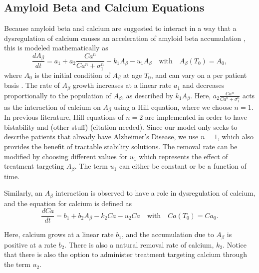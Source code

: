 \documentclass[12pt]{article}
\theoremstyle{definition}
\begin{document}
\subsection{Amyloid Beta and Calcium Equations}
Because amyloid beta and calcium are suggested to interact in a way that a dysregulation of calcium causes an acceleration of amyloid beta accumulation \cite{pal2025nonequilibrium}, this is modeled mathematically as 
\begin{equation}
    \label{eq:abeta_dt}
    \frac{dA_{\beta}}{dt} = a_{1} + a_{2} \frac{Ca^n}{Ca^n + \sigma_1^n} - k_{1} A_{\beta} - u_{1} A_{\beta} \quad \text{with} \quad A_{\beta}(T_{0}) = A_{0},
\end{equation}
where $A_0$ is the initial condition of $A_\beta$ at age $T_0$, and can vary on a per patient basis \cite{hao2022optimal}. The rate of $A_\beta$ growth increases at a linear rate $a_1$ and decreases proportionally to the population of $A_\beta$, as described by $k_1 A_\beta$. Here, $a_2 \frac{Ca^n}{Ca^n + \sigma_1^n}$ acts as the interaction of calcium on $A _{\beta}$ using a Hill equation, where we choose $n=1$. In previous literature, Hill equations of $n=2$ are implemented in order to have bistability and (other stuff) (citation needed). Since our model only seeks to describe patients that already have Alzheimer's Disease, we use $n=1$, which also provides the benefit of tractable stability solutions. The removal rate can be modified by choosing different values for $u_1$ which represents the effect of treatment targeting $A_\beta$. The term $u_1$ can either be constant or be a function of time.

Similarly, an $A_\beta$ interaction is observed to have a role in dysregulation of calcium, and the equation for calcium is defined as 
\begin{equation}
    \label{eq:calcium_dt}
    \frac{dCa}{dt}= b _{1}+b _{2}A _{\beta}-k _{2}Ca - u _{2}Ca\quad \text{with} \quad Ca(T _{0})=Ca _{0}.
\end{equation}

Here, calcium grows at a linear rate $b_1$, and the accumulation due to $A_\beta$ is positive at a rate $b _{2}$. There is also a natural removal rate of calcium, $k _{2}$. Notice that there is also the option to administer treatment targeting calcium through the term $u_2$. \bigskip
\end{document}
